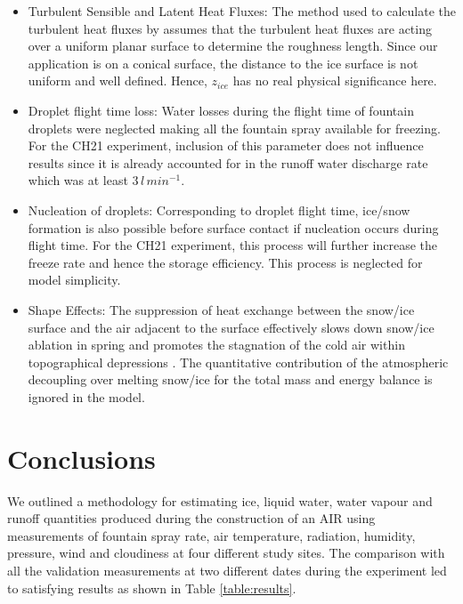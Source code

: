 \documentclass[utf8]{frontiersSCNS} %
\begin{document}
\begin{itemize}

\item  Turbulent Sensible and Latent Heat Fluxes: The method used to calculate the turbulent heat fluxes by
  \cite{Garratt_1992} assumes that the turbulent heat fluxes are acting over a uniform planar surface to determine the
  roughness length. Since our application is on a conical surface, the distance to the ice surface is not
  uniform and well defined. Hence, $z_{ice}$ has no real physical significance here.

\item Droplet flight time loss: Water losses during the flight time of fountain droplets were neglected making all the
  fountain spray available for freezing. For the CH21 experiment, inclusion of this parameter does not influence
  results since it is already accounted for in the runoff water discharge rate which was at least $3\, l\,min^{-1}$.

\item Nucleation of droplets: Corresponding to droplet flight time, ice/snow formation is also possible before surface
  contact if nucleation occurs during flight time. For the CH21 experiment, this process will further increase
  the freeze rate and hence the storage efficiency. This process is neglected for model simplicity.
\item Shape Effects: The suppression of heat exchange between the snow/ice surface and the air adjacent to the surface
  effectively slows down snow/ice ablation in spring and promotes the stagnation of the cold air within topographical
  depressions \citep{Fujita_2010}. The quantitative contribution of the atmospheric decoupling over melting snow/ice
  for the total mass and energy balance is ignored in the model.

\end{itemize}

\section{Conclusions} 
We outlined a methodology for estimating ice, liquid water, water vapour and runoff quantities produced during the
construction of an AIR using measurements of fountain spray rate, air temperature, radiation, humidity, pressure,
wind and cloudiness at four different study sites. The comparison with all the validation measurements at two different
dates during the experiment led to satisfying results as shown in Table \ref{table:results}.
\end{document}

